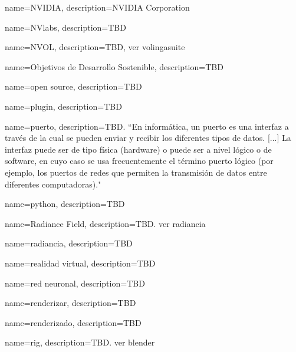 {
    name={NVIDIA},
    description={NVIDIA Corporation}
}

{
    name={NVlabs},
    description={TBD}
}

{
    name={NVOL},
    description={TBD, ver \gls{volingasuite}}
}


{
    name={Objetivos de Desarrollo Sostenible},
    description={TBD}
}

{
    name={open source},
    description={TBD}
}


{
    name={plugin},
    description={TBD}
}

{
    name={puerto},
    description={TBD. ``En informática, un puerto es una interfaz a través de la cual se pueden enviar y recibir los diferentes tipos de datos. [...]
    La interfaz puede ser de tipo física (\gls{hardware}) o puede ser a nivel lógico o de \gls{software}, en cuyo caso se usa frecuentemente el término puerto lógico (por ejemplo, los puertos de redes que permiten la transmisión de datos entre diferentes computadoras)." \cite{eswiki:161631161}}
}

{
    name={python},
    description={TBD}
}



{
    name={Radiance Field},
    description={TBD. ver \gls{radiancia}}
}

{
    name={radiancia},
    description={TBD}
}

{
    name={realidad virtual},
    description={TBD}
}

{
    name={red neuronal},
    description={TBD}
}

{
    name={renderizar},
    description={TBD}
}

{
    name={renderizado},
    description={TBD}
}

{
    name={rig},
    description={TBD. ver \gls{blender}}
}

